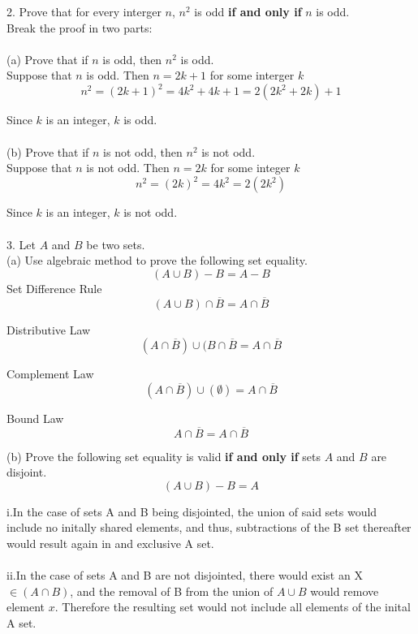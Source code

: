 \documentclass[10pt]{article}
\begin{document}
2. Prove that for every interger $n$, $n^2$ is odd \textbf{if and only if} $n$ is odd.\\
Break the proof in two parts:\\~\\
(a) Prove that if $n$ is odd, then $n^2$ is odd.\\

Suppose that $n$ is odd.  Then $n = 2k + 1$ for some interger $k$\\
$$n^2 = (2k + 1)^2 = 4k^2 + 4k + 1 = 2(2k^2 + 2k) + 1$$

Since $k$ is an integer, $k$ is odd.\\~\\

(b) Prove that if $n$ is not odd, then $n^2$ is not odd.\\

Suppose that $n$ is not odd.  Then $n = 2k$ for some integer $k$\\
$$n^2 = (2k)^2 = 4k^2 = 2(2k^2)$$

Since $k$ is an integer, $k$ is not odd.\\~\\

3. Let $A$ and $B$ be two sets.\\
(a) Use algebraic method to prove the following set equality.
$$(A \cup B) - B = A - B$$
Set Difference Rule
$$(A \cup B) \cap \overline{B} = A \cap \overline{B}$$

Distributive Law
$$(A \cap \overline{B}) \cup (B \cap \overline{B} = A \cap \overline{B}$$

Complement Law
$$(A \cap \overline{B}) \cup (\emptyset) = A \cap \overline{B}$$

Bound Law
$$A \cap \overline {B} = A \cap \overline{B}$$


(b) Prove the following set equality is valid \textbf{if and only if} sets $A$ and $B$ are disjoint.
$$(A \cup B) - B = A$$

i.In the case of sets A and B being disjointed, the union of said sets would include no initally shared elements, and thus, subtractions of the B set thereafter would result again in and exclusive A set.\\~\\

ii.In the case of sets A and B are not disjointed, there would exist an X $\in (A \cap B)$, and the removal of B from the union of $A \cup B$ would remove element $x$.  Therefore the resulting set would not include all elements of the inital A set.\\~\\
\end{document}
